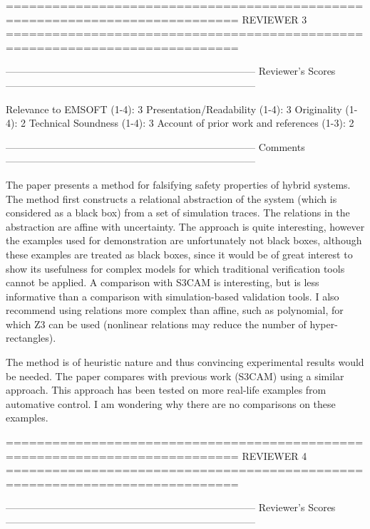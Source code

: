 ============================================================================
                            REVIEWER 3
============================================================================


---------------------------------------------------------------------------
Reviewer's Scores
---------------------------------------------------------------------------

               Relevance to EMSOFT (1-4): 3
          Presentation/Readability (1-4): 3
                       Originality (1-4): 2
               Technical Soundness (1-4): 3
Account of prior work and references (1-3): 2


---------------------------------------------------------------------------
Comments
---------------------------------------------------------------------------

The paper presents a method for falsifying safety properties of hybrid systems.
The method first constructs a relational abstraction of the system (which is
considered as a black box) from a set of simulation traces. The relations in
the abstraction are affine with uncertainty. The approach is quite interesting,
however the examples used for demonstration are unfortunately not black boxes,
although these examples are treated as black boxes, since it would be of great
interest to show its usefulness for complex models for which traditional
verification tools cannot be applied. A comparison with S3CAM is interesting,
but is less informative than a comparison with simulation-based validation
tools.
I also recommend using relations more complex than affine, such as polynomial,
for which Z3 can be used (nonlinear relations may reduce the number of
hyper-rectangles).

The method is of heuristic nature and thus convincing experimental results
would be needed. The paper compares with previous work (S3CAM) using a similar
approach. This approach has been tested on more real-life examples from
automative control. I am wondering why there are no comparisons on these
examples.

============================================================================
                            REVIEWER 4
============================================================================


---------------------------------------------------------------------------
Reviewer's Scores
---------------------------------------------------------------------------


